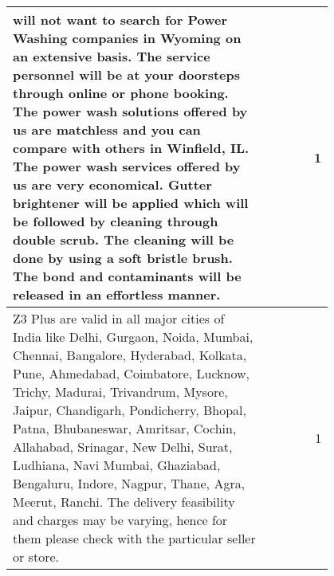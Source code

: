 \begin{table*}[h]
\begin{tabular}{p{0.8\linewidth}|r}
    \hline
    will not want to search for Power Washing companies in Wyoming on an extensive basis. The service personnel will be at your doorsteps through online or phone booking. The power wash solutions offered by us are matchless and you can compare with others in Winfield, IL. The power wash services offered by us are very economical. Gutter brightener will be applied which will be followed by cleaning through double scrub. The cleaning will be done by using a soft bristle brush. The bond and contaminants will be released in an effortless manner. & 1 \\
    \hline
    Z3 Plus are valid in all major cities of India like Delhi, Gurgaon, Noida, Mumbai, Chennai, Bangalore, Hyderabad, Kolkata, Pune, Ahmedabad, Coimbatore, Lucknow, Trichy, Madurai, Trivandrum, Mysore, Jaipur, Chandigarh, Pondicherry, Bhopal, Patna, Bhubaneswar, Amritsar, Cochin, \newline{}Allahabad, Srinagar, New Delhi, Surat, Ludhiana, Navi Mumbai, Ghaziabad, Bengaluru, Indore, Nagpur, Thane, Agra, Meerut, Ranchi. The delivery feasibility and charges may be varying, hence for them please check with the particular seller or store. & 1 \\
    \bottomrule
    \end{tabular}%
\end{table*}%
